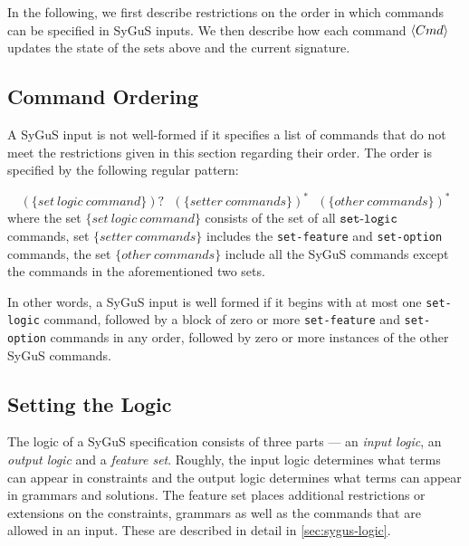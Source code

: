 \documentclass[english,a4paper,10pt]{article}
\begin{document}
In the following, we first describe restrictions
on the order in which commands can be specified in SyGuS inputs.
We then describe how each command $\left\langle Cmd\right\rangle$ updates
the state of the sets above and the current signature.

\subsection{Command Ordering}
A SyGuS input is not well-formed
if it specifies a list of commands that do not meet
the restrictions given in this section regarding their order. The
order is specified by the following regular pattern:

\vspace*{2mm}
\noindent
\begin{equation*}
(\mathit{\{ set\ logic\ command \}})?\mbox{ }\mathit{(\{setter\ commands\})^*\mbox{ }(\{other\ commands\})^*}
\end{equation*}
where the set $\mathit{\{set\ logic\ command\}}$ consists
of the set of all ${\tt set\mbox{-}logic}$ commands,
set $\mathit{\{setter\ commands\}}$ includes
the \texttt{set-feature} and \texttt{set-option}
commands, the set $\mathit{\{other\ commands\}}$ include all the SyGuS
commands except the commands in the aforementioned two sets.

In other words, a SyGuS input is well formed if it begins with 
at most one \texttt{set-logic} command, followed by 
a block of zero or more \texttt{set-feature}
and \texttt{set-option} commands in any order, 
followed by zero or more instances of the other SyGuS commands.

\subsection{Setting the Logic}
\label{ssec:set-logic}
The logic of a SyGuS specification consists of three parts ---
an \emph{input logic}, an \emph{output logic} and a \emph{feature set}.
Roughly, 
the input logic determines what terms
can appear in constraints and
the output logic determines
what terms can appear in grammars and solutions.
The feature set places additional restrictions or extensions 
on the constraints, grammars as well as the commands that are allowed in an input.
These are described in detail in \cref{sec:sygus-logic}.
\end{document}
